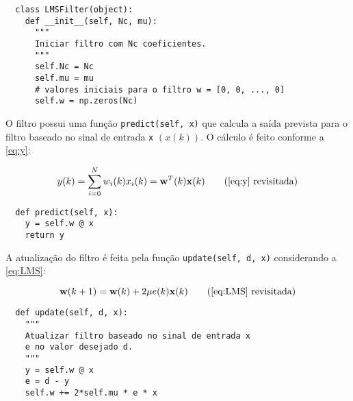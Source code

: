 \begin{verbatim}
  class LMSFilter(object):
    def __init__(self, Nc, mu):
      """
      Iniciar filtro com Nc coeficientes.
      """
      self.Nc = Nc
      self.mu = mu
      # valores iniciais para o filtro w = [0, 0, ..., 0]
      self.w = np.zeros(Nc)
\end{verbatim}

O filtro possui uma função \texttt{predict(self, x)} que calcula a saída prevista para o filtro baseado no sinal de entrada \texttt{x} $(x(k))$. O cálculo é feito conforme a \cref{eq:y}:

\begin{equation*}
y(k) = \sum_{i=0}^{N} w_i(k) x_i(k) = {\bf w}^T(k) {\bf x}(k) \tag{\ref{eq:y} revisitada}
\end{equation*}

\begin{verbatim}
  def predict(self, x):
    y = self.w @ x
    return y
\end{verbatim}

A atualização do filtro é feita pela função \texttt{update(self, d, x)} considerando a \cref{eq:LMS}:

\begin{equation*}
{\bf w}(k+1) = {\bf w}(k) + 2 \mu e(k) {\bf x}(k) \tag{\ref{eq:LMS} revisitada}
\end{equation*}

\begin{verbatim}
  def update(self, d, x):
    """
    Atualizar filtro baseado no sinal de entrada x
    e no valor desejado d.
    """
    y = self.w @ x
    e = d - y
    self.w += 2*self.mu * e * x
\end{verbatim}